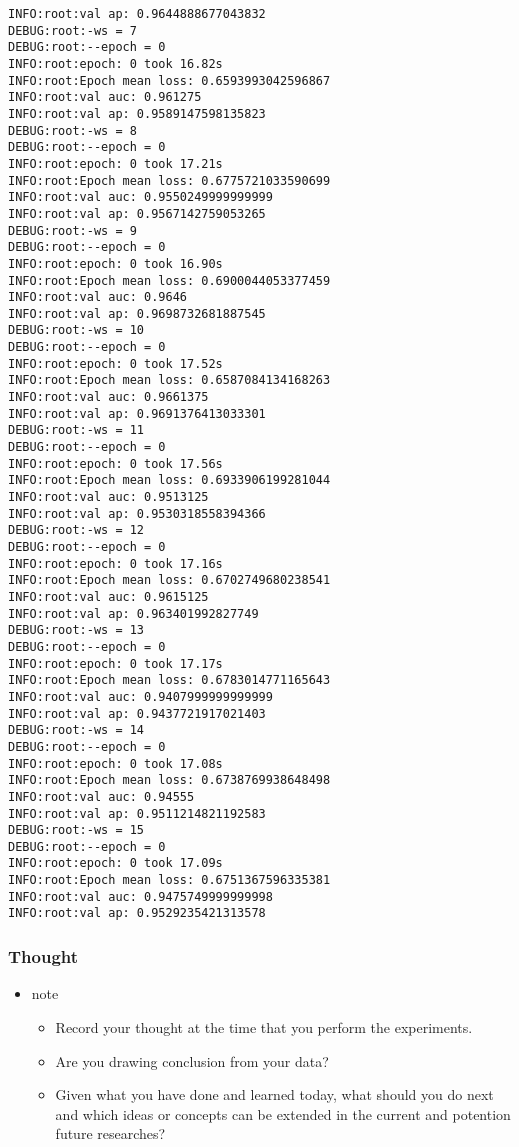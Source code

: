 \documentclass[11pt]{article}
\begin{document}
\begin{verbatim}
INFO:root:val ap: 0.9644888677043832
DEBUG:root:-ws = 7
DEBUG:root:--epoch = 0
INFO:root:epoch: 0 took 16.82s
INFO:root:Epoch mean loss: 0.6593993042596867
INFO:root:val auc: 0.961275
INFO:root:val ap: 0.9589147598135823
DEBUG:root:-ws = 8
DEBUG:root:--epoch = 0
INFO:root:epoch: 0 took 17.21s
INFO:root:Epoch mean loss: 0.6775721033590699
INFO:root:val auc: 0.9550249999999999
INFO:root:val ap: 0.9567142759053265
DEBUG:root:-ws = 9
DEBUG:root:--epoch = 0
INFO:root:epoch: 0 took 16.90s
INFO:root:Epoch mean loss: 0.6900044053377459
INFO:root:val auc: 0.9646
INFO:root:val ap: 0.9698732681887545
DEBUG:root:-ws = 10
DEBUG:root:--epoch = 0
INFO:root:epoch: 0 took 17.52s
INFO:root:Epoch mean loss: 0.6587084134168263
INFO:root:val auc: 0.9661375
INFO:root:val ap: 0.9691376413033301
DEBUG:root:-ws = 11
DEBUG:root:--epoch = 0
INFO:root:epoch: 0 took 17.56s
INFO:root:Epoch mean loss: 0.6933906199281044
INFO:root:val auc: 0.9513125
INFO:root:val ap: 0.9530318558394366
DEBUG:root:-ws = 12
DEBUG:root:--epoch = 0
INFO:root:epoch: 0 took 17.16s
INFO:root:Epoch mean loss: 0.6702749680238541
INFO:root:val auc: 0.9615125
INFO:root:val ap: 0.963401992827749
DEBUG:root:-ws = 13
DEBUG:root:--epoch = 0
INFO:root:epoch: 0 took 17.17s
INFO:root:Epoch mean loss: 0.6783014771165643
INFO:root:val auc: 0.9407999999999999
INFO:root:val ap: 0.9437721917021403
DEBUG:root:-ws = 14
DEBUG:root:--epoch = 0
INFO:root:epoch: 0 took 17.08s
INFO:root:Epoch mean loss: 0.6738769938648498
INFO:root:val auc: 0.94555
INFO:root:val ap: 0.9511214821192583
DEBUG:root:-ws = 15
DEBUG:root:--epoch = 0
INFO:root:epoch: 0 took 17.09s
INFO:root:Epoch mean loss: 0.6751367596335381
INFO:root:val auc: 0.9475749999999998
INFO:root:val ap: 0.9529235421313578
\end{verbatim}

\subsubsection{Thought}
\label{sec:org0c13240}
\begin{itemize}
\item note
\begin{itemize}
\item Record your thought at the time that you perform the experiments.
\item Are you drawing conclusion from your data?
\item Given what you have done and learned today, what should you do next and which ideas or concepts can be extended in the current and potention future researches?
\end{itemize}
\end{itemize}
\end{document}

